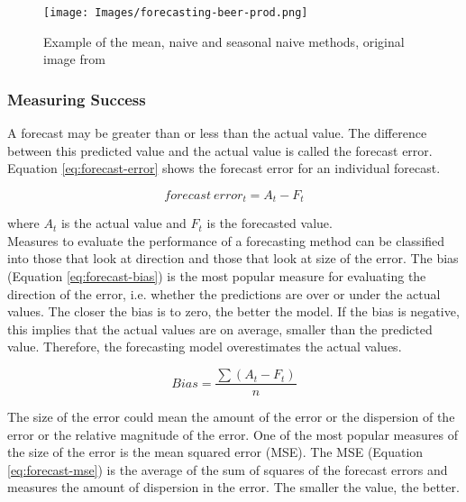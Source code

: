 \begin{figure}[H]
\begin{center}
    \texttt{[image: Images/forecasting-beer-prod.png]}
    \caption{Example of the mean, naive and seasonal naive methods, original image from \cite{forecasting-book}}
    \label{fig:forecasting}
\end{center}
\end{figure}

\subsubsection{Measuring Success}

A forecast may be greater than or less than the actual value. The difference between this predicted value and the actual value is called the forecast error. Equation \ref{eq:forecast-error} shows the forecast error for an individual forecast.

\begin{equation}
\label{eq:forecast-error}
    forecast\ error_t = A_t - F_t
\end{equation}

\noindent where $A_t$ is the actual value and $F_t$ is the forecasted value. \\

Measures to evaluate the performance of a forecasting method can be classified into those that look at direction and those that look at size of the error. The bias (Equation \ref{eq:forecast-bias}) is the most popular measure for evaluating the direction of the error, i.e. whether the predictions are over or under the actual values. The closer the bias is to zero, the better the model. If the bias is negative, this implies that the actual values are on average, smaller than the predicted value. Therefore, the forecasting model overestimates the actual values.

\begin{equation}
\label{eq:forecast-bias}
    Bias = \frac{\sum(A_t-F_t)}{n}
\end{equation}

The size of the error could mean the amount of the error or the dispersion of the error or the relative magnitude of the error. One of the most popular measures of the size of the error is the mean squared error (MSE). The MSE (Equation \ref{eq:forecast-mse}) is the average of the sum of squares of the forecast errors and measures the amount of dispersion in the error. The smaller the value, the better.


